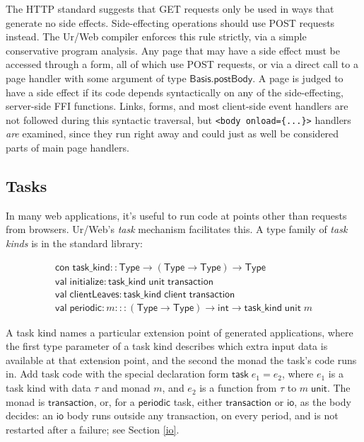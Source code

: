 \documentclass{article}
\newcommand{\mt}[1]{\mathsf{#1}}
\begin{document}
\medskip

The HTTP standard suggests that GET requests only be used in ways that generate no side effects.  Side-effecting operations should use POST requests instead.  The Ur/Web compiler enforces this rule strictly, via a simple conservative program analysis.  Any page that may have a side effect must be accessed through a form, all of which use POST requests, or via a direct call to a page handler with some argument of type $\mt{Basis.postBody}$.  A page is judged to have a side effect if its code depends syntactically on any of the side-effecting, server-side FFI functions.  Links, forms, and most client-side event handlers are not followed during this syntactic traversal, but \texttt{<body onload=\{...\}>} handlers \emph{are} examined, since they run right away and could just as well be considered parts of main page handlers.

\subsection{\label{tasks}Tasks}

In many web applications, it's useful to run code at points other than requests from browsers.  Ur/Web's \emph{task} mechanism facilitates this.  A type family of \emph{task kinds} is in the standard library:

$$\begin{array}{l}
\mt{con} \; \mt{task\_kind} :: \mt{Type} \to (\mt{Type} \to \mt{Type}) \to \mt{Type} \\
\mt{val} \; \mt{initialize} : \mt{task\_kind} \; \mt{unit} \; \mt{transaction} \\
\mt{val} \; \mt{clientLeaves} : \mt{task\_kind} \; \mt{client} \; \mt{transaction} \\
\mt{val} \; \mt{periodic} : m ::: (\mt{Type} \to \mt{Type}) \to \mt{int} \to \mt{task\_kind} \; \mt{unit} \; m
\end{array}$$

A task kind names a particular extension point of generated applications, where the first type parameter of a task kind describes which extra input data is available at that extension point, and the second the monad the task's code runs in.  Add task code with the special declaration form $\mt{task} \; e_1 = e_2$, where $e_1$ is a task kind with data $\tau$ and monad $m$, and $e_2$ is a function from $\tau$ to $m \; \mt{unit}$.  The monad is $\mt{transaction}$, or, for a $\mt{periodic}$ task, either $\mt{transaction}$ or $\mt{io}$, as the body decides: an $\mt{io}$ body runs outside any transaction, on every period, and is not restarted after a failure; see Section \ref{io}.
\end{document}
